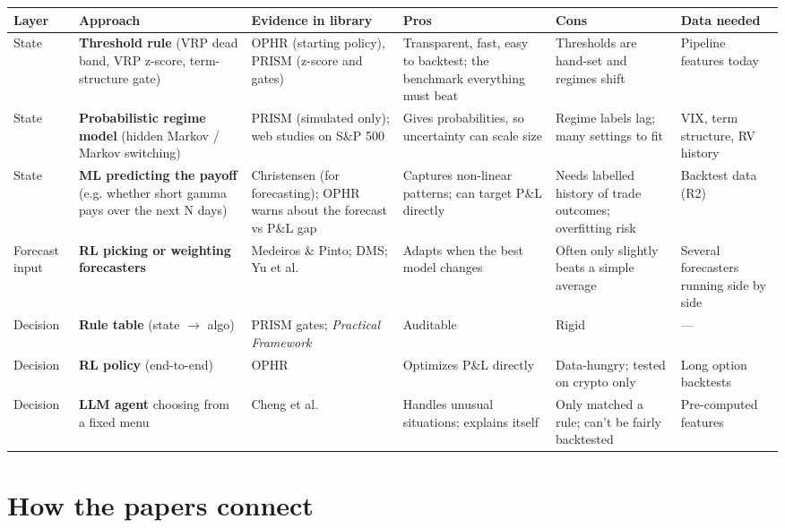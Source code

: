 \documentclass{article}
\begin{document}
\begin{center}\small
\begin{tabularx}{\linewidth}{>{\raggedright\arraybackslash}X >{\raggedright\arraybackslash}X >{\raggedright\arraybackslash}X >{\raggedright\arraybackslash}X >{\raggedright\arraybackslash}X >{\raggedright\arraybackslash}X}
\toprule
\textbf{Layer} & \textbf{Approach} & \textbf{Evidence in library} & \textbf{Pros} & \textbf{Cons} & \textbf{Data needed} \\
\midrule
State & \textbf{Threshold rule} (VRP dead band, VRP z-score, term-structure gate) & OPHR (starting policy), PRISM (z-score and gates) & Transparent, fast, easy to backtest; the benchmark everything must beat & Thresholds are hand-set and regimes shift & Pipeline features today \\
State & \textbf{Probabilistic regime model} (hidden Markov /\allowbreak{} Markov switching) & PRISM (simulated only); web studies on S\&P 500 & Gives probabilities, so uncertainty can scale size & Regime labels lag; many settings to fit & VIX, term structure, RV history \\
State & \textbf{ML predicting the payoff} (e.g. whether short gamma pays over the next N days) & Christensen (for forecasting); OPHR warns about the forecast vs P\&L gap & Captures non-linear patterns; can target P\&L directly & Needs labelled history of trade outcomes; overfitting risk & Backtest data (R2) \\
Forecast input & \textbf{RL picking or weighting forecasters} & Medeiros \& Pinto; DMS; Yu et al. & Adapts when the best model changes & Often only slightly beats a simple average & Several forecasters running side by side \\
Decision & \textbf{Rule table} (state \ensuremath{\rightarrow} algo) & PRISM gates; \emph{Practical Framework} & Auditable & Rigid & --- \\
Decision & \textbf{RL policy} (end-to-end) & OPHR & Optimizes P\&L directly & Data-hungry; tested on crypto only & Long option backtests \\
Decision & \textbf{LLM agent} choosing from a fixed menu & Cheng et al. & Handles unusual situations; explains itself & Only matched a rule; can't be fairly backtested & Pre-computed features \\
\bottomrule
\end{tabularx}
\end{center}

\section{How the papers connect}
\end{document}
